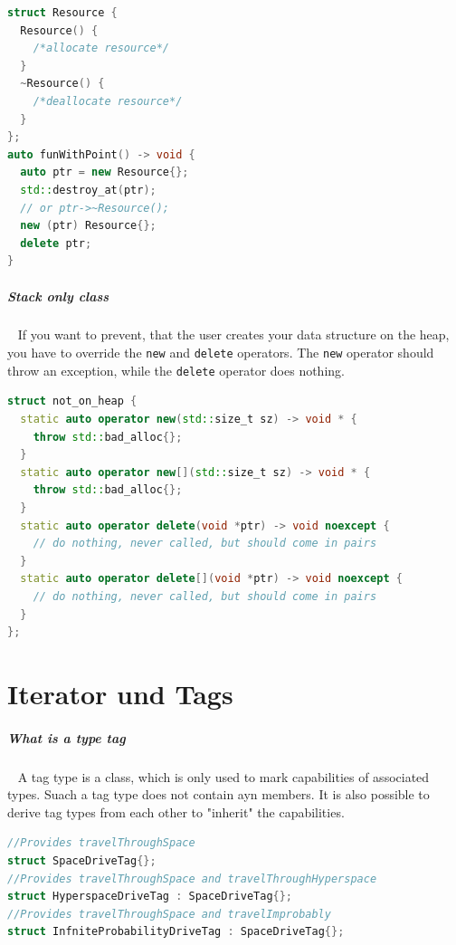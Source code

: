 \documentclass[11pt,twoside,landscape]{article}
\begin{document}
\begin{multicols}{2}
\begin{lstlisting}[language=c++,label=lst:example-for-placement-new-and-delete,caption={Example for placement new and delete},captionpos=b,numbers=none]
struct Resource {
  Resource() {
    /*allocate resource*/
  }
  ~Resource() {
    /*deallocate resource*/
  }
};
auto funWithPoint() -> void {
  auto ptr = new Resource{};
  std::destroy_at(ptr);
  // or ptr->~Resource();
  new (ptr) Resource{};
  delete ptr;
}
\end{lstlisting}

\subparagraph{Stack only class} \
\label{sec:orgc34e4d1}
If you want to prevent, that the user creates your data structure on the heap, you have to override the \texttt{new} and \texttt{delete} operators.
The \texttt{new} operator should throw an exception, while the \texttt{delete} operator does nothing.

\begin{lstlisting}[language=c++,label=lst:example-struct-with-overriden-operators,caption={Example struct with overriden operators},captionpos=b,numbers=none]
struct not_on_heap {
  static auto operator new(std::size_t sz) -> void * {
    throw std::bad_alloc{};
  }
  static auto operator new[](std::size_t sz) -> void * {
    throw std::bad_alloc{};
  }
  static auto operator delete(void *ptr) -> void noexcept {
    // do nothing, never called, but should come in pairs
  }
  static auto operator delete[](void *ptr) -> void noexcept {
    // do nothing, never called, but should come in pairs
  }
};
\end{lstlisting}

\section{Iterator und Tags}
\label{sec:org1fbec65}
\subparagraph{What is a type tag} \
\label{sec:org3406e85}
A tag type is a class, which is only used to mark capabilities of associated types.
Suach a tag type does not contain ayn members.
It is also possible to derive tag types from each other to "inherit" the capabilities.


\begin{lstlisting}[language=c++,numbers=none]
//Provides travelThroughSpace
struct SpaceDriveTag{};
//Provides travelThroughSpace and travelThroughHyperspace
struct HyperspaceDriveTag : SpaceDriveTag{};
//Provides travelThroughSpace and travelImprobably
struct InfniteProbabilityDriveTag : SpaceDriveTag{};
\end{lstlisting}


\end{multicols}
\end{document}
